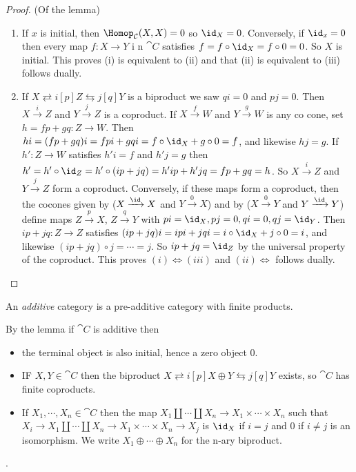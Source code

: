 \documentclass[../main.tex]{subfiles}
\begin{document}
\begin{proof}(Of the lemma)
	\begin{enumerate}
    	\item If $x$ is initial, then $\Hom_{\cat C}(X, X) = 0$ so $\id_X = 0$.
		Conversely, if $\id_x = 0$ then every map $f: X \to Y$ i n $\cat C$ satisfies $f = f \circ \id_X = f \circ 0 = 0$. So $X$ is initial. This proves (i) is equivalent to (ii) and that (ii) is equivalent to (iii) follows dually.
		\item If $X \rightleftarrows{i}[p] Z \leftrightarrows{j}[q] Y$ is a biproduct we saw $qi = 0$ and $pj = 0$. Then $X \xrightarrow{i} Z$ and $Y \xrightarrow{j} Z$ is a coproduct. If $X \xrightarrow{f} W$ and $Y \xrightarrow{g} W$ is any co cone, set $h = fp + gq: Z \to W$. Then $hi = (fp + gq)i = fpi + gqi = f \circ \id_X + g \circ 0 = f$, and likewise $hj = g$. If $h': Z \to W$ satisfies $h'i = f$ and $h'j = g$ then $h' = h' \circ \id_Z = h' \circ (ip + jq) = h'ip + h'jq = fp + gq = h$. So $X \xrightarrow{i} Z$ and $Y \xrightarrow{j} Z$ form a coproduct. Conversely, if these maps form a coproduct, then the cocones given by ($X \xrightarrow{\id} X$ and $Y \xrightarrow{0} X$) and by ($X \xrightarrow{0} Y$ and $Y \xrightarrow{\id} Y$) define maps $Z \xrightarrow{p} X$, $Z \xrightarrow{q} Y$ with $pi = \id_X, pj = 0, qi = 0, qj = \id_Y$. Then $ip + jq: Z \to Z$ satisfies $(ip + jq)i = ipi + jqi = i \circ \id_X + j \circ 0 = i$, and likewise $(ip + jq)\circ j = \cdots = j$. So $ip + jq = \id_Z$ by the universal property of the coproduct. This proves $(i) \Leftrightarrow (iii)$ and $(ii) \Leftrightarrow$ follows dually.
    \end{enumerate}
\end{proof}
\begin{defn}
	An \emph{additive} category is a pre-additive category with finite products.
\end{defn}
\begin{rmk}
	By the lemma  if $\cat C$ is additive then
	\begin{itemize}
    	\item the terminal object is also initial, hence a zero object $0$.
		\item IF $X, Y \in \cat C$ then the biproduct $X \rightleftarrows{i}[p] X \oplus Y \leftrightarrows{j}[q] Y$ exists, so $\cat C$ has finite coproducts.
		\item If $X_1, \cdots, X_n \in \cat C$ then the map $X_1 \coprod \cdots \coprod X_n \to X_1 \times \cdots \times X_n$ such that $X_i \to X_1 \coprod \cdots \coprod X_n \to X_1 \times \cdots \times X_n \to X_j$ is $\id_X$ if $i = j$ and $0$ if $i \neq j$ is an isomorphism. We write $X_1 \oplus \cdots \oplus X_n$ for the n-ary biproduct.
    \end{itemize}

\end{rmk}
\begin{exc}
	.
\end{exc}
\end{document}
